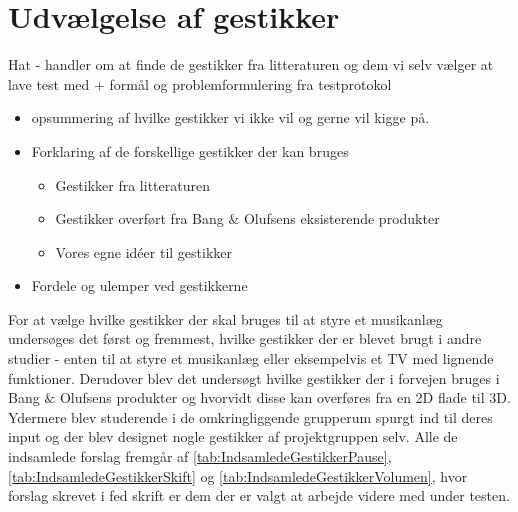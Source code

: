 \section{Udvælgelse af gestikker}
\label{UdvaelgelseAfGestikker}
%
Hat - handler om at finde de gestikker fra litteraturen og dem vi selv vælger at lave test med + formål og problemformulering fra testprotokol
%

\begin{itemize}
  \item opsummering af hvilke gestikker vi ikke vil og gerne vil kigge på.
  \item Forklaring af de forskellige gestikker der kan bruges
  \begin{itemize}
  	\item Gestikker fra litteraturen
  	\item Gestikker overført fra Bang $\&$ Olufsens eksisterende produkter
  	\item Vores egne idéer til gestikker
  \end{itemize}
  \item Fordele og ulemper ved gestikkerne
\end{itemize}

For at vælge hvilke gestikker der skal bruges til at styre et musikanlæg undersøges det først og fremmest, hvilke gestikker der er blevet brugt i andre studier - enten til at styre et musikanlæg eller eksempelvis et TV med lignende funktioner. Derudover blev det undersøgt hvilke gestikker der i forvejen bruges i Bang $\&$ Olufsens produkter og hvorvidt disse kan overføres fra en 2D flade til 3D. Ydermere blev studerende i de omkringliggende grupperum spurgt ind til deres input og der blev designet nogle gestikker af projektgruppen selv. Alle de indsamlede forslag fremgår af \autoref{tab:IndsamledeGestikkerPause}, \autoref{tab:IndsamledeGestikkerSkift} og \autoref{tab:IndsamledeGestikkerVolumen}, hvor forslag skrevet i fed skrift er dem der er valgt at arbejde videre med under testen.




